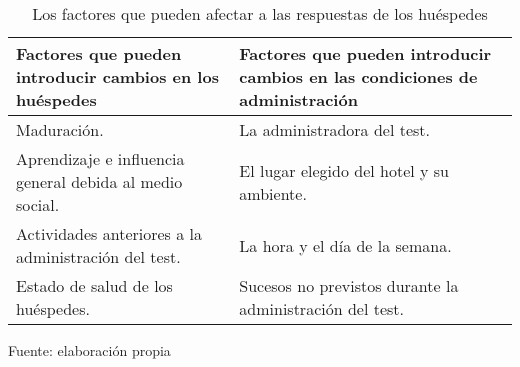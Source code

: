 \begin{table}[h]
    \caption {Los factores que pueden afectar a las respuestas de los huéspedes}
	\label{tab:respuestas}
	\setlength\extrarowheight{5pt}
	
	\begin{tabular}{p{7cm} p{7.5cm}}
	\toprule
	Factores que pueden introducir cambios en los huéspedes                                           & Factores que pueden introducir cambios en las condiciones de administración                                                                             \\ 
\midrule
	Maduración.                 & La administradora del test.                           \\
	Aprendizaje e influencia general debida al medio social.       & El lugar elegido del hotel y su ambiente.                 \\
	Actividades anteriores a la administración del test.             & La hora y el día de la semana. \\
	Estado de salud de los huéspedes. & Sucesos no previstos durante la administración del test.                         \\ 
	\bottomrule
	\end{tabular}

	\center
	\footnotesize
	Fuente: elaboración propia
\end{table}
